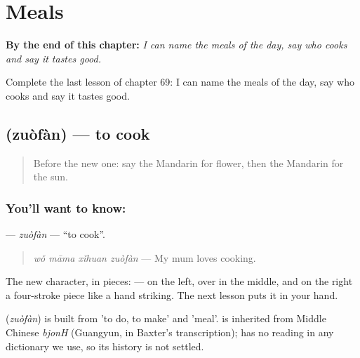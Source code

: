 
\chapter{Meals}
\label{ch:zh-meals}

\begin{chapteropening}
\textbf{By the end of this chapter:} \emph{I can name the meals of the day, say who cooks and say it tastes good.}

Complete the last lesson of chapter 69: I can name the meals of the day, say who cooks and say it tastes good.
\end{chapteropening}

\section[\texorpdfstring{\zh{做饭} (zuòfàn)}{做饭 (zuòfàn)}]{ (zuòfàn) — to cook}

\label{lesson:ZH-C69-zuofan}



\begin{quote}
Before the new one: say the Mandarin for flower, then the Mandarin for the sun.
\end{quote}

\subsection*{You'll want to know: }
\textbf{} — \emph{zuòfàn} — \textquotedblleft{}to cook\textquotedblright{}.

\begin{quote}
\textbf{} \emph{wǒ māma xǐhuan zuòfàn} — My mum loves cooking.
\end{quote}

The new character, in pieces:  —  on the left,  over  in the middle, and on the right a four-stroke piece like a hand striking. The next lesson puts it in your hand.

\begin{cousinweb}
\textbf{} (\emph{zuòfàn}) is built from  'to do, to make' and  'meal'.  is inherited from Middle Chinese \emph{bjonH} (Guangyun, in Baxter's transcription);  has no reading in any dictionary we use, so its history is not settled.
\end{cousinweb}

